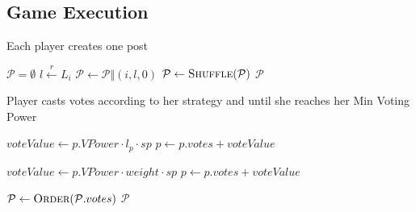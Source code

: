   \subsection{Game Execution}
    \begin{algorithm}
      \caption{Each player creates one post}
      \label{alg:postGen}
      \begin{algorithmic}[1]
        \State $\mathcal{P} = \emptyset$ 
           \State $l \xleftarrow{r} L_i$
           \State $\mathcal{P} \leftarrow \mathcal{P} \Vert \left(i, l, 0\right)$
        \EndFor
        \State $\mathcal{P} \leftarrow \textsc{Shuffle}(\mathcal{P})$
        \State \Return $\mathcal{P}$
      \EndFunction
      \end{algorithmic}
    \end{algorithm}

    \begin{algorithm}[H]
      \caption{Player casts votes according to her strategy and until she
      reaches her Min Voting Power}
      \label{alg:vote}
      \begin{algorithmic}[1]
              \State
                \State $voteValue \leftarrow p.VPower \cdot l_p \cdot sp$
                \State $p \leftarrow p.votes +  voteValue$
              \EndIf
            \EndFor
          \EndCase

               \State
                 \State $voteValue \leftarrow p.VPower \cdot weight \cdot sp$
                 \State $p \leftarrow p.votes +  voteValue$
               \EndIf
             \EndFor
          \EndCase
        \EndSwitch

        \State $\mathcal{P} \leftarrow \textsc{Order}(\mathcal{P}.votes)$
        \State \Return $\mathcal{P}$
      \EndFunction
      \end{algorithmic}
    \end{algorithm}

